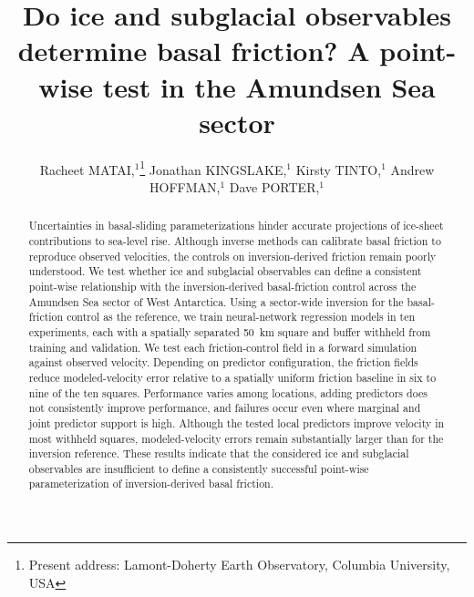 \documentclass[review,jog]{igs}
\begin{document}
\def\FinalPass{1}

\title[Testing point-wise inference of basal friction]{Do ice and subglacial observables determine basal friction? A point-wise test in the Amundsen Sea sector}

\author[Matai and others]{Racheet MATAI,$^1$\protect\thanks{Present address:
  Lamont-Doherty Earth Observatory, Columbia University, USA}
  Jonathan KINGSLAKE,$^1$ Kirsty TINTO,$^1$ Andrew HOFFMAN,$^1$ Dave PORTER,$^1$}


\begin{frontmatter}
\maketitle
\begin{abstract}
Uncertainties in basal-sliding parameterizations hinder accurate projections of ice-sheet contributions to sea-level rise. Although inverse methods can calibrate basal friction to reproduce observed velocities, the controls on inversion-derived friction remain poorly understood. We test whether ice and subglacial observables can define a consistent point-wise relationship with the inversion-derived basal-friction control across the Amundsen Sea sector of West Antarctica. Using a sector-wide inversion for the basal-friction control as the reference, we train neural-network regression models in ten experiments, each with a spatially separated 50~km square and buffer withheld from training and validation. We test each friction-control field in a forward simulation against observed velocity. Depending on predictor configuration, the friction fields reduce modeled-velocity error relative to a spatially uniform friction baseline in six to nine of the ten squares. Performance varies among locations, adding predictors does not consistently improve performance, and failures occur even where marginal and joint predictor support is high. Although the tested local predictors improve velocity in most withheld squares, modeled-velocity errors remain substantially larger than for the inversion reference. These results indicate that the considered ice and subglacial observables are insufficient to define a consistently successful point-wise parameterization of inversion-derived basal friction.
\end{abstract}
\end{frontmatter}
\end{document}
